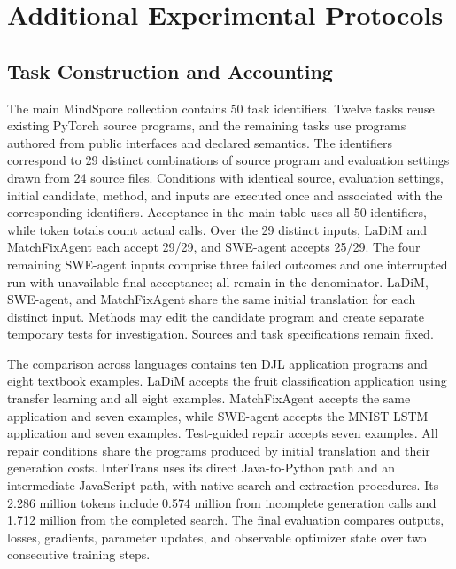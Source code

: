 \section{Additional Experimental Protocols}
\label{sec:supplementary-protocols}

\subsection{Task Construction and Accounting}
\label{sec:task-construction}
\begin{table}[!htb]
\caption{Program collections for migration and repair, with their candidate construction, model coverage, and task counts.}
\label{tab:collections}
\centering
\small
\setlength{\tabcolsep}{3pt}

\end{table}
The main MindSpore collection contains 50 task identifiers. Twelve tasks reuse existing PyTorch source programs, and the remaining tasks use programs authored from public interfaces and declared semantics. The identifiers correspond to 29 distinct combinations of source program and evaluation settings drawn from 24 source files. Conditions with identical source, evaluation settings, initial candidate, method, and inputs are executed once and associated with the corresponding identifiers. Acceptance in the main table uses all 50 identifiers, while token totals count actual calls. Over the 29 distinct inputs, LaDiM and MatchFixAgent each accept 29/29, and SWE-agent accepts 25/29. The four remaining SWE-agent inputs comprise three failed outcomes and one interrupted run with unavailable final acceptance; all remain in the denominator. LaDiM, SWE-agent, and MatchFixAgent share the same initial translation for each distinct input. Methods may edit the candidate program and create separate temporary tests for investigation. Sources and task specifications remain fixed.

The comparison across languages contains ten DJL application programs and eight textbook examples. LaDiM accepts the fruit classification application using transfer learning and all eight examples. MatchFixAgent accepts the same application and seven examples, while SWE-agent accepts the MNIST LSTM application and seven examples. Test-guided repair accepts seven examples. All repair conditions share the programs produced by initial translation and their generation costs. InterTrans uses its direct Java-to-Python path and an intermediate JavaScript path, with native search and extraction procedures. Its 2.286 million tokens include 0.574 million from incomplete generation calls and 1.712 million from the completed search. The final evaluation compares outputs, losses, gradients, parameter updates, and observable optimizer state over two consecutive training steps.

